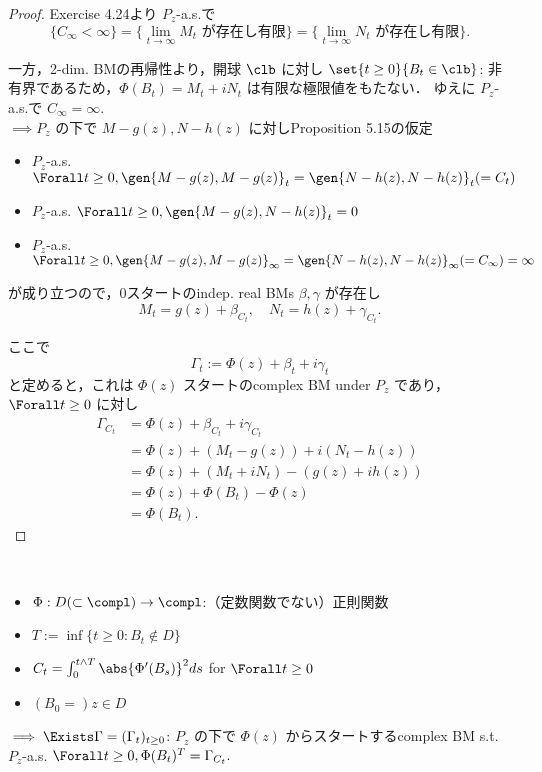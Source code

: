 \documentclass{jsarticle}
\begin{document}
\begin{proof}
    Exercise 4.24より $P_z$-a.s.で
    $$
    \{C_\infty<\infty\}
    = \{\lim_{t\to\infty}M_t\text{ が存在し有限}\}
    = \{\lim_{t\to\infty}N_t\text{ が存在し有限}\}.
    $$
    
    一方，2-dim. BMの再帰性より，開球 $\clb$ に対し $\set{t\ge0}{B_t\in\clb}$: 非有界であるため，$\Phi(B_t)=M_t+iN_t$ は有限な極限値をもたない．
    ゆえに $P_z$-a.s.で $C_\infty=\infty.$ \\
    $\implies P_z$ の下で $M-g(z), N-h(z)$ に対しProposition 5.15の仮定
    \begin{itemize}
        \item 
        $P_z$-a.s. $\Forall t\ge0, \gen{M-g(z), M-g(z)}_t=\gen{N-h(z), N-h(z)}_t(=C_t)$
        \item 
        $P_z$-a.s. $\Forall t\ge0, \gen{M-g(z), N-h(z)}_t=0$
        \item 
        $P_z$-a.s. $\Forall t\ge0, \gen{M-g(z), M-g(z)}_{\infty}=\gen{N-h(z), N-h(z)}_{\infty}(=C_\infty)=\infty$
    \end{itemize}
    が成り立つので，0スタートのindep. real BMs $\beta, \gamma$ が存在し
    $$
    M_t=g(z)+\beta_{C_t},\quad
    N_t=h(z)+\gamma_{C_t}.
    $$

    ここで
    $$
    \Gamma_t
    := \Phi(z)+\beta_t+i\gamma_t
    $$
    と定めると，これは $\Phi(z)$ スタートのcomplex BM under $P_z$ であり，$\Forall t\ge0$ に対し
    \begin{align}
        \Gamma_{C_t}
        &= \Phi(z)+\beta_{C_t}+i\gamma_{C_t} \\
        &= \Phi(z)+(M_t-g(z))+i(N_t-h(z)) \\
        &= \Phi(z)+(M_t+iN_t)-(g(z)+ih(z)) \\
        &= \Phi(z)+\Phi(B_t)-\Phi(z) \\
        &= \Phi(B_t).
    \end{align}
\end{proof}

\begin{screen}
    \begin{thm*}~
        \begin{itemize}
            \item 
            $\Phi:D(\subset \compl)\to\compl$:（定数関数でない）正則関数
            \item 
            $T:=\inf\{t\ge0:B_t\notin D\}$
            \item 
            $C_t=\int_0^{t\wedge T}\abs{\Phi'(B_s)}^2ds$ for $\Forall t\ge0$
            \item 
            $(B_0=)z\in D$
        \end{itemize}
        $\implies \Exists \Gamma=(\Gamma_t)_{t\ge0}$: $P_z$ の下で $\Phi(z)$ からスタートするcomplex BM s.t. $P_z$-a.s. $\Forall t\ge0, \Phi(B_t)^T=\Gamma_{C_t}.$
    \end{thm*}
\end{screen}
\end{document}

